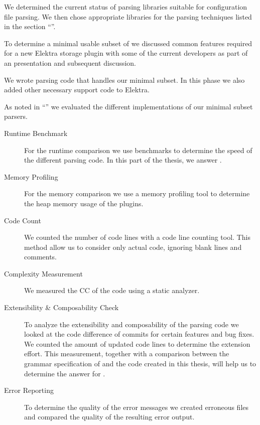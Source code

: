 \begin{description}[style=multiline, leftmargin=3.2cm, font=\bfseries]

  \item[Literature Review] We determined the current status of parsing libraries suitable for configuration file parsing. We then chose appropriate libraries for the parsing techniques listed in the section “”.

  \item[Discussion] To determine a minimal usable subset of  we discussed common features required for a new Elektra storage plugin with some of the current developers as part of an presentation and subsequent discussion.

  \item[Implementation] We wrote parsing code that handles our minimal  subset. In this phase we also added other necessary support code to Elektra.

  \item[Comparison] As noted in “” we evaluated the different implementations of our minimal  subset parsers.

  \begin{description}
    \item[Runtime Benchmark] For the runtime comparison we use benchmarks to determine the speed of the different parsing code. In this part of the thesis, we answer .

    \item[Memory Profiling] For the memory comparison we use a memory profiling tool to determine the heap memory usage of the  plugins.

    \item[Code Count] We counted the number of code lines with a code line counting tool. This method allow us to consider only actual code, ignoring blank lines and comments.

    \item[Complexity Measurement] We measured the \gls{CC} of the code using a static analyzer.

    \item[Extensibility \& Composability Check] To analyze the extensibility and composability of the parsing code we looked at the code difference of commits for certain features and bug fixes. We counted the amount of updated code lines to determine the extension effort. This measurement, together with a comparison between the grammar specification of  and the code created in this thesis, will help us to determine the answer for .

    \item[Error Reporting] To determine the quality of the error messages we created erroneous files and compared the quality of the resulting error output.
  \end{description}

\end{description}

